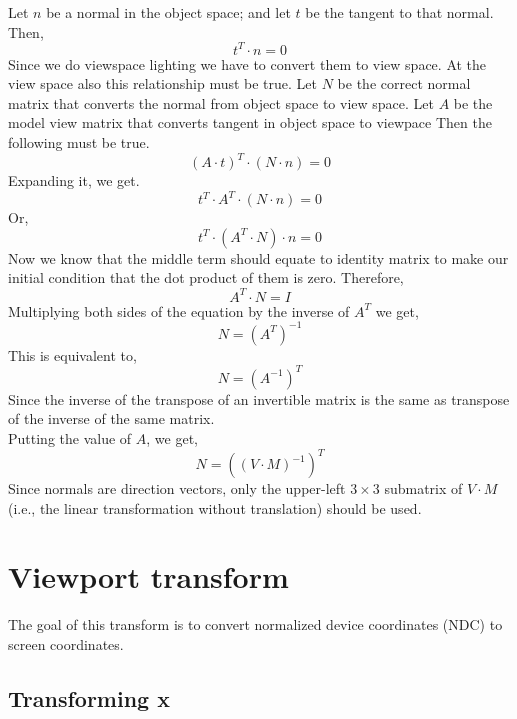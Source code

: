 Let $n$ be a normal in the object space; and let $t$ be the tangent to that normal. Then, 
\[
t^T \cdot n = 0
\]
Since we do viewspace lighting we have to convert them to view space. At the view space also this relationship must be true. Let $N$ be the correct normal matrix that converts the normal from object space to view space. Let $A$ be the model view matrix that converts tangent in object space to viewpace
Then the following must be true.
\[
(A  \cdot t )^T \cdot (N  \cdot n) = 0
\]
Expanding it, we get.
\[
t^T \cdot A^T \cdot (N \cdot n) = 0
\]
Or,
\[
t^T \cdot (A^T \cdot N) \cdot n = 0
\]
Now we know that the middle term should equate to identity matrix to make our initial condition that the dot product of them is zero. 
Therefore, 
\[
A^T \cdot N = I
\]
Multiplying both sides of the equation by the inverse of $A^T$ we get,
\[
N = (A^T)^{-1}
\]
This is equivalent to,
\[
N = (A^{-1})^T
\]
Since the inverse of the transpose of an invertible matrix is the same as transpose of the inverse of the same matrix.\\
Putting the value of $A$, we get,
\begin{equation}
N = ((V \cdot M)^{-1})^T
\end{equation}
Since normals are direction vectors, only the upper-left \( 3 \times 3 \) submatrix of \( V \cdot M \) (i.e., the linear transformation without translation) should be used.

\section{Viewport transform}
The goal of this transform is to convert normalized device coordinates (NDC) to screen coordinates. 
\subsection{Transforming x}


